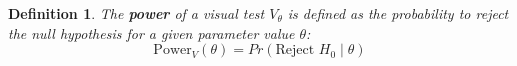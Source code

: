 \documentclass{article}
\newcommand{\red}[1]{{\color{red} #1}}
\newtheorem{dfn}{Definition}[section]
\begin{document}




%
%
\begin{dfn} \label{dfn:power}
The \textbf{power} of a visual test $V_{\theta}$ is defined as the probability to reject the null hypothesis for a given parameter value $\theta$:
    \begin{equation*}
      \text{Power}_V(\theta)= Pr(\text{Reject } H_0 \mid \theta) 
    \end{equation*}
\end{dfn}
\end{document}
